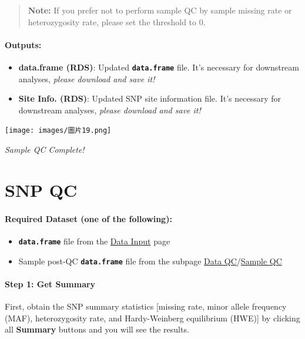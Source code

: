 \documentclass[
]{book}
\begin{document}
\begin{quote}
\textbf{Note:} If you prefer not to perform sample QC by sample missing rate or heterozygosity rate, please set the threshold to 0.
\end{quote}

\paragraph*{Outputs:}\label{outputs-1}

\begin{itemize}
\item
  \textbf{data.frame (RDS)}: Updated {\textbf{\texttt{data.frame}}} file. It's necessary for downstream analyses, \emph{please download and save it!}
\item
  \textbf{Site Info. (RDS)}: Updated SNP site information file. It's necessary for downstream analyses, \emph{please download and save it!}
\end{itemize}

\texttt{[image: images/圖片19.png]}

\emph{Sample QC Complete!}

\section{SNP QC}\label{snp-qc}

\paragraph*{Required Dataset (one of the following):}\label{required-dataset-one-of-the-following-2}

\begin{itemize}
\item
  {\textbf{\texttt{data.frame}}} file from the \ul{Data Input} page
\item
  Sample post-QC {\textbf{\texttt{data.frame}}} file from the subpage \ul{Data QC}/\ul{Sample QC}
\end{itemize}

\paragraph*{Step 1: Get Summary}\label{step-1-get-summary-1}

First, obtain the SNP summary statistics {[}missing rate, minor allele frequency (MAF), heterozygosity rate, and Hardy-Weinberg equilibrium (HWE){]} by clicking all {\textbf{Summary}} buttons and you will see the results.
\end{document}
